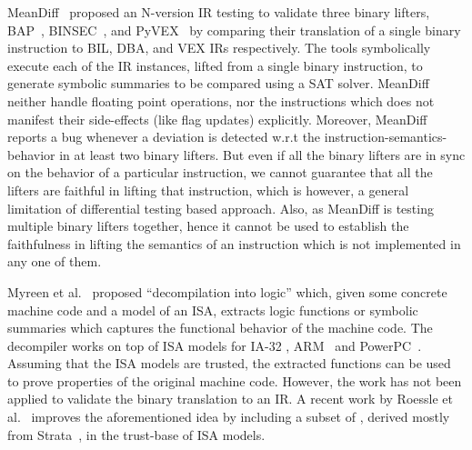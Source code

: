 MeanDiff~\cite{ASE2017} proposed an N-version IR testing to validate three binary
lifters, BAP~\cite{BAP:CAV11}, BINSEC~\cite{BINSEC2011}, and PyVEX~\cite{PYVEX}
by comparing their translation of a single binary instruction to BIL, DBA, and VEX IRs respectively.
The tools symbolically execute each of the IR instances, lifted from a single
binary instruction, to generate symbolic summaries to be compared using a SAT
solver. MeanDiff neither handle floating point operations, nor the instructions
which does not manifest their side-effects (like flag updates) explicitly.
Moreover, MeanDiff reports a bug whenever a deviation is detected w.r.t the
instruction-semantics-behavior in at least two binary lifters. But even if all
the binary lifters are in sync on the behavior of a particular instruction, we
cannot guarantee that all the lifters are faithful in lifting that instruction,
       which is however, a general limitation of differential testing based
       approach. Also, as MeanDiff is testing multiple binary lifters
       together, hence it cannot be used to establish the faithfulness in
       lifting the semantics of an instruction which is not implemented in any one
       of them.

Myreen et al.~\cite{Myreen:FMCAD:2008,Myreen:FMCAD:2012} proposed
``decompilation into logic'' which, given some concrete machine code and a
model of an ISA, extracts logic functions or symbolic summaries which captures
the functional behavior of the machine code. The decompiler works on top of ISA
models for IA-32 \cite{Karl2003}, ARM~\cite{Fox2003} and
PowerPC~\cite{Leroy:2006}. Assuming that the ISA models are trusted, the
extracted functions can be used to prove properties of the original machine
code. However, the work has not been applied to validate the binary translation to an IR.
A recent work by Roessle et al.~\cite{Roessle:CPP19} improves the
aforementioned idea  by including a subset of \ISA, derived mostly from
Strata~\cite{Heule2016a}, in the trust-base of ISA models.   




